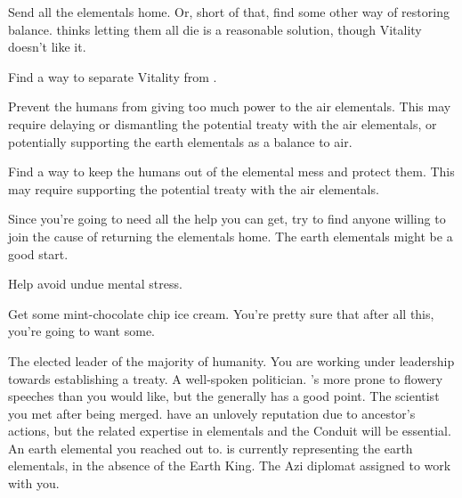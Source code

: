 \documentclass[char]{elementals}
\begin{document}
\begin{itemz}[Goals]
	\item  Send all the elementals home.  Or, short of that, find some other way of restoring balance.  \cAvatar{} thinks letting them all die is a reasonable solution, though Vitality doesn't like it.
	\item  Find a way to separate Vitality from \cAvatar{}.
	\item  Prevent the humans from giving too much power to the air elementals.  This may require delaying or dismantling the potential treaty with the air elementals, or potentially supporting the earth elementals as a balance to air.
	\item  Find a way to keep the humans out of the elemental mess and protect them.  This may require supporting the potential treaty with the air elementals.
	\item  Since you're going to need all the help you can get, try to find anyone willing to join the cause of returning the elementals home.  The earth elementals might be a good start.
	\item  Help \cDiplomat{} avoid undue mental stress.
	\item  Get some mint-chocolate chip ice cream.  You're pretty sure that after all this, you're going to want some.
\end{itemz}

\begin{contacts}
	\contact{\cLeader{}}  The elected leader of the majority of humanity.  You are working under \cLeader{\their} leadership towards establishing a treaty.
	\contact{\cDema{}}  A well-spoken politician.  \cDema{\They}'s more prone to flowery speeches than you would like, but the \cDema{\human} generally has a good point.
	\contact{\cGD{}}  The scientist you met after being merged.  \cGD{\They} have an unlovely reputation due to \cGD{\their} ancestor's actions, but the related expertise in elementals and the Conduit will be essential.
	\contact{\cLoyal{}}  An earth elemental you reached out to.  \cLoyal{\They} is currently representing the earth elementals, in the absence of the Earth King.
	\contact{\cDiplomat{}}  The Azi diplomat assigned to work with you.
\end{contacts}
\end{document}
